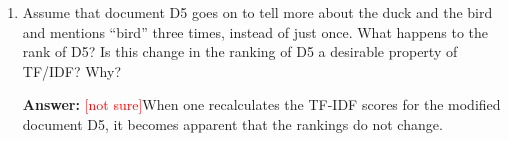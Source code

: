 \documentclass{article}
\newenvironment{QandA}{\begin{enumerate}[label=\arabic*.]}{\end{enumerate}}
\newenvironment{InnerQandA}{\begin{enumerate}[label=\roman*.]}{\end{enumerate}}
\newenvironment{answer}{\par\normalfont \textbf{Answer:}}{}
\newcommand{\notsure}{\textcolor{red}{[not sure]}}
\begin{document}
\begin{QandA}
\begin{InnerQandA}
\begin{answer}
            Now, we calculate the cosine similarities between the TF-IDF scores in order to obtain a ranking of the document similarity:
            \begin{align*}
                \cos \left( \text{Q}, \text{D1} \right) &= 0 \\
                \cos \left( \text{Q}, \text{D2} \right) &= 0.73 \\
                \cos \left( \text{Q}, \text{D3} \right) &= 0.63 \\
                \cos \left( \text{Q}, \text{D4} \right) &= 0.82 \\
                \cos \left( \text{Q}, \text{D5} \right) &= 0.54
            \end{align*}
            We obtain that the two most similar documents to Q are D4 and D2. However, one could argue that those two documents are not most relevant to the query Q, since D3 and D5 are semantically somewhat closer in meaning.
        \end{answer}

        \item Assume that document D5 goes on to tell more about the duck and the bird and mentions ``bird'' three times, instead of just once. What happens to the rank of D5? Is this change in the ranking of D5 a desirable property of TF/IDF? Why?
        \begin{answer}
            \notsure When one recalculates the TF-IDF scores for the modified document D5, it becomes apparent that the rankings do not change. 
        \end{answer}
    \end{InnerQandA}


\end{QandA}
\end{document}
